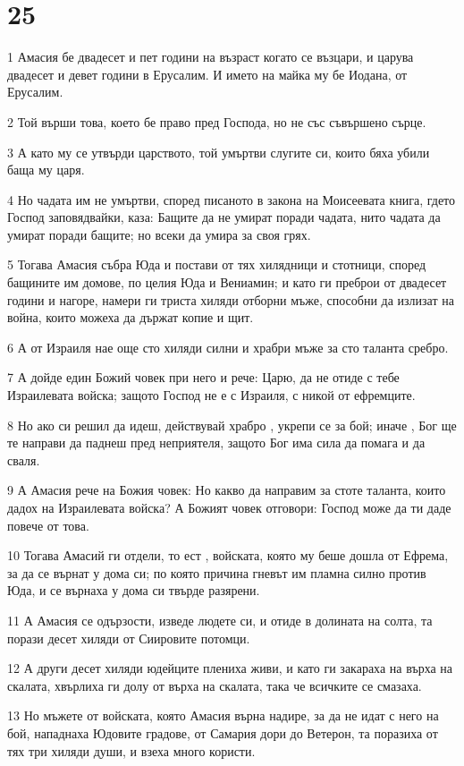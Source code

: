 \chapter{25}

\par 1 Амасия бе двадесет и пет години на възраст когато се възцари, и царува двадесет и девет години в Ерусалим. И името на майка му бе Иодана, от Ерусалим.
\par 2 Той върши това, което бе право пред Господа, но не със съвършено сърце.
\par 3 А като му се утвърди царството, той умъртви слугите си, които бяха убили баща му царя.
\par 4 Но чадата им не умъртви, според писаното в закона на Моисеевата книга, гдето Господ заповядвайки, каза: Бащите да не умират поради чадата, нито чадата да умират поради бащите; но всеки да умира за своя грях.
\par 5 Тогава Амасия събра Юда и постави от тях хилядници и стотници, според бащините им домове, по целия Юда и Вениамин; и като ги преброи от двадесет години и нагоре, намери ги триста хиляди отборни мъже, способни да излизат на война, които можеха да държат копие и щит.
\par 6 А от Израиля нае още сто хиляди силни и храбри мъже за сто таланта сребро.
\par 7 А дойде един Божий човек при него и рече: Царю, да не отиде с тебе Израилевата войска; защото Господ не е с Израиля, с никой от ефремците.
\par 8 Но ако си решил да идеш, действувай храбро , укрепи се за бой; иначе , Бог ще те направи да паднеш пред неприятеля, защото Бог има сила да помага и да сваля.
\par 9 А Амасия рече на Божия човек: Но какво да направим за стоте таланта, които дадох на Израилевата войска? А Божият човек отговори: Господ може да ти даде повече от това.
\par 10 Тогава Амасий ги отдели, то ест , войската, която му беше дошла от Ефрема, за да се върнат у дома си; по която причина гневът им пламна силно против Юда, и се върнаха у дома си твърде разярени.
\par 11 А Амасия се одързости, изведе людете си, и отиде в долината на солта, та порази десет хиляди от Сиировите потомци.
\par 12 А други десет хиляди юдейците плениха живи, и като ги закараха на върха на скалата, хвърлиха ги долу от върха на скалата, така че всичките се смазаха.
\par 13 Но мъжете от войската, която Амасия върна надире, за да не идат с него на бой, нападнаха Юдовите градове, от Самария дори до Ветерон, та поразиха от тях три хиляди души, и взеха много користи.

